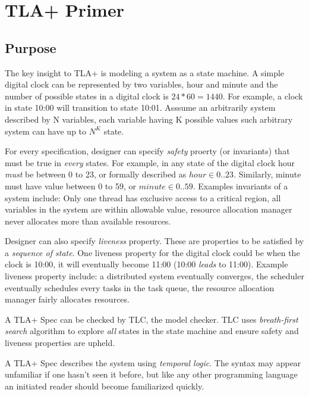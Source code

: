 \chapter{TLA+ Primer}

\section{Purpose}

The key insight to TLA+ is modeling a system as a state machine. A simple
digital clock can be represented by two variables, hour and minute and the
number of possible states in a digital clock is $24 * 60 = 1440$. For example,
a clock in state 10:00 will transition to state 10:01. Asssume an arbitrarily
system described by N variables, each variable having K possible values such
arbitrary system can have up to $N^K$ state.\newline

For every specification, designer can specify \textit{safety} proerty (or
invariants) that must be true in \textit{every} states. For example, in any
state of the digital clock hour \textit{must} be between 0 to 23, or formally
described as $hour \in 0..23$. Similarly, minute must have value between 0 to
59, or $minute \in 0..59$. Examples invariants of a system include: Only one
thread has exclusive access to a critical region, all variables in the system
are within allowable value, resource allocation manager never allocates more
than available resources.\newline

Designer can also specify \textit{liveness} property. These are properties to be
satisfied by a \textit{sequence of state}. One liveness property for the digital
clock could be when the clock is 10:00, it will eventually become 11:00 (10:00
\textit{leads} to 11:00). Example liveness property include: a distributed
system eventually converges, the scheduler eventually schedules every tasks in
the task queue, the resource allocation manager fairly allocates resources.
\newline

A TLA+ Spec can be checked by TLC, the model checker. TLC uses
\textit{breath-first search} algorithm to explore \textit{all} states in the
state machine and ensure safety and liveness properties are upheld.\newline

A TLA+ Spec describes the system using \textit{temporal logic}. The syntax may 
appear unfamiliar if one hasn't seen it before, but like any other programming 
language an initiated reader should become familiarized quickly.

